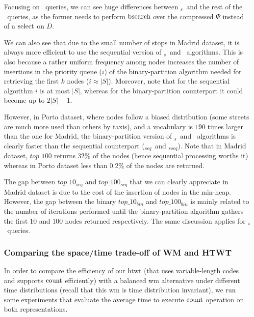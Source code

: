 	Focusing on \topK\ queries, we can see huge differences between \topK$_s$\  
	and the rest of the \topK\ queries, as the former needs to perform {$ \operatorname{bsearch}$} over the compressed $\Psi$
	instead of a $\operatorname{select}$ on $D$. 

	We can also see that due to the small number of stops in Madrid dataset, it is always more efficient to use the sequential version of \topK$_s$\ and \topK\ algorithms. This is also because a rather uniform frequency among nodes 
	increases the number of insertions in the priority queue ($i$) of the \mbox{binary-partition} algorithm
	needed for retrieving the first $k$ nodes ($i \approx |S|$). Moreover, note that for the sequential algorithm $i$ is at most $|S|$, whereas for the binary-partition counterpart it could become up to $2|S|-1$.

	However, in Porto dataset, where nodes follow a biased distribution (some streets are much more used than others by taxis), and a vocabulary 
	is $190$ times larger than the one for Madrid, the binary-partition version of \topK$_s$\ and \topK\ algorithms is clearly
	faster than the sequential counterpart (\topK$_{seq}$\ and \topK$_{sseq}$).
	Note that in Madrid dataset, $top\_100$ returns 32\% of the nodes (hence sequential processing worths it) 
	whereas in Porto dataset less than 0.2\% of the nodes are returned. 

	The gap between $top\_10_{seq}$ and $top\_100_{seq}$ that we can clearly appreciate in Madrid dataset 
	is due to the cost of the insertion of nodes in the min-heap. However, the gap between 
	the binary $top\_10_{bin}$ and $top\_100_{bin}$ 
	is mainly related to the number of iterations performed until the binary-partition algorithm gathers the first
	$10$ and $100$ {nodes}  returned respectively. The same discussion applies for \topK$_s$\ queries.


	\subsubsection{Comparing the space/time trade-off of WM and HTWT}
	\label{sec:ctr:exp:queries:wt}
	In order to compare the efficiency of our \gls{htwt} (that uses variable-length codes and supports $\operatorname{count}$ efficiently) with a balanced \gls{wm} alternative under 
	different time distributions (recall that this \gls{wm} is time distribution invariant), 
	we run some experiments that evaluate the average time to execute $\operatorname{count}$ operation on
	both representations.

